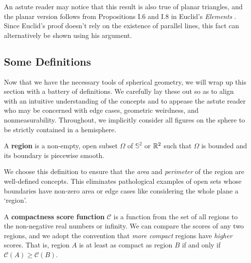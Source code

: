 An astute reader may notice that this result is also true of planar triangles, and the planar version follows from Propositions I.6 and I.8 in Euclid's \textit{Elements} \cite{elements,se_triangle}.  Since Euclid's proof doesn't rely on the existence of parallel lines, this fact can alternatively be shown using his argument.



\subsection{Some Definitions}

Now that we have the necessary tools of spherical geometry, we will wrap up this section with a battery of definitions. 
We carefully lay these out so
as to align with an intuitive understanding of the concepts and to
appease the astute reader who may be concerned with edge cases,
geometric weirdness, and nonmeasurability. 
Throughout, we implicitly consider all figures on the sphere to be strictly contained in a hemisphere.








\begin{definition}
	A \textbf{region} is a non-empty, open subset $\Omega$ of $\mathbb{S}^2$ or $\mathbb{R}^2$ such that $\Omega$ is bounded and its boundary is piecewise smooth.
\end{definition}

We choose this definition to ensure that the \textit{area} and \textit{perimeter} of the region are well-defined concepts.  This eliminates pathological examples of open sets whose boundaries have non-zero area or edge cases like considering the whole plane a \enquote*{region}.











\begin{definition}
A \textbf{compactness score function} $\mathcal{C}$ is a function from
the set of all regions to the non-negative real numbers or infinity.  We can compare 
the scores of any two regions, and we adopt the convention that 
\textit{more compact} regions have \textit{higher} scores.  That is,
region $A$ is at least as compact as region $B$ if and only if 
$\mathcal{C}(A)\geq    \mathcal{C}(B)$.
\end{definition}

